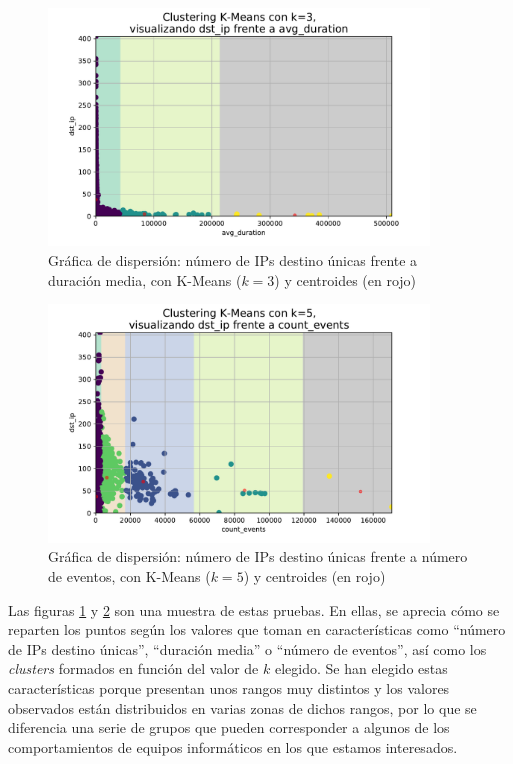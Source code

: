 \begin{figure}[h]
    \centering
    \captionsetup{width=0.75\textwidth}
    \includegraphics[width=0.9\textwidth]{contenido/fig/dispersion-k3-dst_ip-vs-avg_duration.pdf}
    \caption{Gráfica de dispersión: número de IPs destino únicas frente a duración media, con K-Means ($k=3$) y centroides (en rojo)}
    \label{fig:scatterdstipavgduration}
\end{figure}

\begin{figure}[h]
    \centering
    \captionsetup{width=0.75\textwidth}
    \includegraphics[width=0.9\textwidth]{contenido/fig/dispersion-k5-dst_ip-vs-count_events.pdf}
    \caption{Gráfica de dispersión: número de IPs destino únicas frente a número de eventos, con K-Means ($k=5$) y centroides (en rojo)}
    \label{fig:scatterdstipcountevents}
\end{figure}

Las figuras \ref{fig:scatterdstipavgduration} y \ref{fig:scatterdstipcountevents} son una muestra de estas pruebas.
En ellas, se aprecia cómo se reparten los puntos según los valores que toman en características como ``número de IPs destino únicas'', ``duración media'' o ``número de eventos'',
así como los \emph{clusters} formados en función del valor de $k$ elegido.
Se han elegido estas características porque presentan unos rangos muy distintos y los valores observados están distribuidos en varias zonas de dichos rangos,
por lo que se diferencia una serie de grupos que pueden corresponder a algunos de los comportamientos de equipos informáticos en los que estamos interesados.

